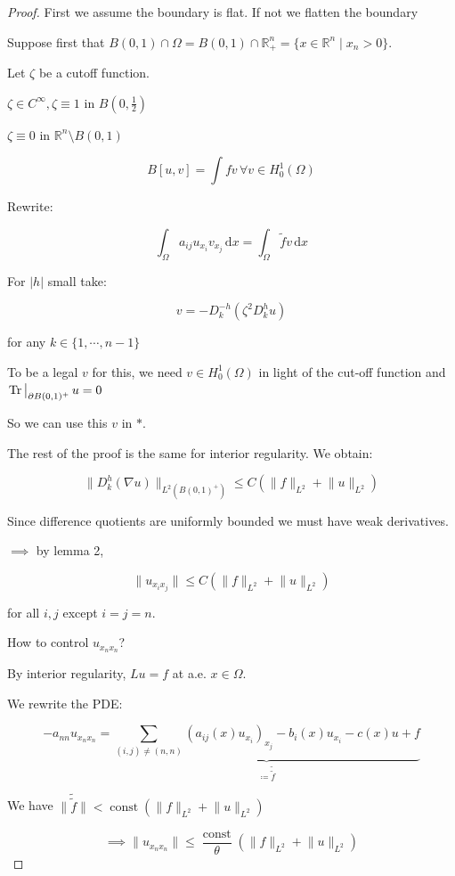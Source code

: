 \documentclass{article}
\theoremstyle{definition}
\begin{document}
\begin{proof}

    First we assume the boundary is flat. If not we flatten the boundary

    Suppose first that \(B(0,1) \cap \Omega = B(0,1) \cap \mathbb{R}^n_+ = \{ x\in \mathbb{R}^n \mid x_n > 0 \}\). 


    Let \(\zeta\) be a cutoff function.

    \(\zeta \in C^{\infty}, \zeta \equiv 1\) in \(B(0,\frac{1}{2})\)

    \(\zeta \equiv 0\) in \(\mathbb{R}^n \setminus B(0,1)\)

    \[
        B[u,v] = \int fv \, \forall v \in H^1_0(\Omega)
    \]

    Rewrite:

    \[
        \int_{\Omega} a_{ij} u_{x_i} v_{x_j} \,\mathrm{d}x = \int_{\Omega} \widetilde{f} v \,\mathrm{d}x 
    \]

    For \(\vert h \vert \) small take:

    \[
        v = - D_k^{-h} (\zeta^2 D_k^h u)
    \]

    for any \(k\in \{ 1, \cdots , n-1 \} \) 

    To be a legal \(v\) for this, we need \(v\in H^1_0(\Omega)\) in light of the cut-off function and \(\eval{\Tr}_{\partial B(0,1)^+} u = 0 \) 

    So we can use this \(v\) in \(\ast\).

    The rest of the proof is the same for interior regularity. We obtain:

    \[
        \lVert D_k^h (\nabla u) \rVert _{L^2(B(0,1)^+)} \leq C \left( \lVert f \rVert _{L^2} + \lVert u \rVert _{L^2} \right) 
    \]

    Since difference quotients are uniformly bounded we must have weak derivatives.

    \(\implies\) by lemma 2,

    \[
        \lVert u_{x_i x_j} \rVert \leq C \left( \lVert f \rVert _{L^2} + \lVert u \rVert _{L^2} \right)
    \]

    for all \(i,j\) except \(i=j=n\).

    How to control \(u_{x_n x_n}\)?

    By interior regularity, \(L u = f\) at a.e. \(x\in \Omega\).

    We rewrite the PDE:

    \[
        - a_{n n} u_{x_n x_n} = \underbrace{\sum_{(i,j) \neq (n,n)} (a_{ij} (x) u_{x_i})_{x_j}  - b_i(x) u_{x_i} - c(x)u + f}_{\coloneqq \tilde{\tilde{f}}}
    \]

    We have \(\lVert \tilde{\tilde{f}} \rVert < \operatorname{const}(\lVert f \rVert _{L^2} + \lVert u \rVert _{L^2})\) 

    \[
        \implies \lVert u_{x_n x_n}  \rVert \leq \frac{\operatorname{const}}{\theta} \left( \lVert f \rVert _{L^2} + \lVert u \rVert _{L^2} \right) 
    \]

\end{proof}
\end{document}
